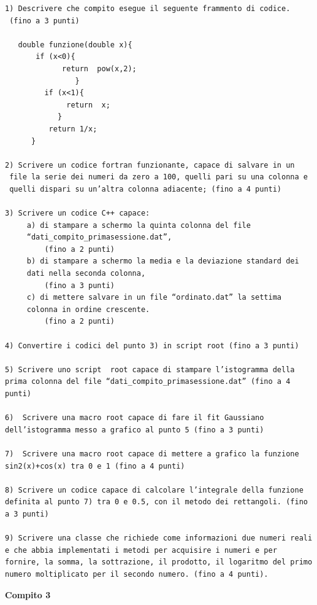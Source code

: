 \documentclass[11pt,fleqn]{book} %
\begin{document}
\begin{verbatim}
1) Descrivere che compito esegue il seguente frammento di codice.
 (fino a 3 punti)

   double funzione(double x){
       if (x<0){
             return  pow(x,2);
                }
         if (x<1){
              return  x;
            }
          return 1/x;
      } 

2) Scrivere un codice fortran funzionante, capace di salvare in un
 file la serie dei numeri da zero a 100, quelli pari su una colonna e 
 quelli dispari su un’altra colonna adiacente; (fino a 4 punti)

3) Scrivere un codice C++ capace:
     a) di stampare a schermo la quinta colonna del file 
     “dati_compito_primasessione.dat”, 
         (fino a 2 punti)
     b) di stampare a schermo la media e la deviazione standard dei 
     dati nella seconda colonna,
         (fino a 3 punti)
     c) di mettere salvare in un file “ordinato.dat” la settima 
     colonna in ordine crescente.
         (fino a 2 punti)

4) Convertire i codici del punto 3) in script root (fino a 3 punti)

5) Scrivere uno script  root capace di stampare l’istogramma della 
prima colonna del file “dati_compito_primasessione.dat” (fino a 4 
punti)

6)  Scrivere una macro root capace di fare il fit Gaussiano 
dell’istogramma messo a grafico al punto 5 (fino a 3 punti)

7)  Scrivere una macro root capace di mettere a grafico la funzione 
sin2(x)+cos(x) tra 0 e 1 (fino a 4 punti)

8) Scrivere un codice capace di calcolare l’integrale della funzione 
definita al punto 7) tra 0 e 0.5, con il metodo dei rettangoli. (fino 
a 3 punti)

9) Scrivere una classe che richiede come informazioni due numeri reali 
e che abbia implementati i metodi per acquisire i numeri e per 
fornire, la somma, la sottrazione, il prodotto, il logaritmo del primo 
numero moltiplicato per il secondo numero. (fino a 4 punti).
\end{verbatim}


\textbf{Compito 3}
\end{document}

